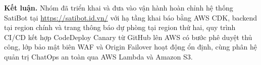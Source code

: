 \documentclass[a4paper,12pt]{article}
\begin{document}
\noindent\textbf{Kết luận.} Nhóm đã triển khai và đưa vào vận hành hoàn chỉnh hệ thống SatiBot tại \url{https://satibot.id.vn/} với hạ tầng khai báo bằng AWS CDK, backend tại region chính và trang thông báo dự phòng tại region thứ hai, quy trình CI/CD kết hợp CodeDeploy Canary từ GitHub lên AWS có bước phê duyệt thủ công, lớp bảo mật biên WAF và Origin Failover hoạt động ổn định, cùng phân hệ quản trị ChatOps an toàn qua AWS Lambda và Amazon S3.
\end{document}
